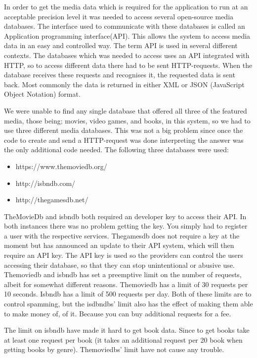 In order to get the media data which is required for the application to run at an acceptable precision level it was needed to access several open-source media databases. The interface used to communicate with these databases is called an Application programming interface(API). This allows the system to access media data in an easy and controlled way. The term API is used in several different contexts\cite{apiWiki}. The databases which was  needed to access uses an API integrated with HTTP, so to access different data there had to be sent HTTP-requests. When the database receives these requests and recognises it, the requested data is sent back. Most commonly the data is returned in either XML or JSON (JavaScript Object Notation) format.

We were unable to find any single database that offered all three of the featured media, those being; movies, video games, and books, in this system, so we had to use three different media databases. This was not a big problem since once the code to create and send a HTTP-request was done interpreting the answer was the only additional code needed.  The following three databases were used:

\begin{itemize}
	\item https://www.themoviedb.org/
	\item http://isbndb.com/
	\item http://thegamesdb.net/
\end{itemize}

TheMovieDb and isbndb both required an developer key to access their API. In both instances there was no problem getting the key. You simply had to register a user with the respective services. %
Thegamesdb does not require a key at the moment but has announced an update to their API system, which will then require an API key.
The API key is used so the providers can control the users accessing their database, so that  they can stop unintentional or abusive use. Themoviedb and isbndb has set a preemptive limit on the number of requests, albeit for somewhat different reasons. Themoviedb has a limit of 30 requests per 10 seconds\cite{themoviedbApi}. Isbndb has a limit of 500 requests per day. Both of these limits are to control spamming, but the isdbndbs’ limit also has the effect of making them able to make money of, of it. Because you can buy additional requests for a fee.

The limit on isbndb have made it hard to get book data. Since to get books take at least one request per book (it takes an additional request per 20 book when getting books by genre). Themoviedbs’ limit have not cause any trouble.

